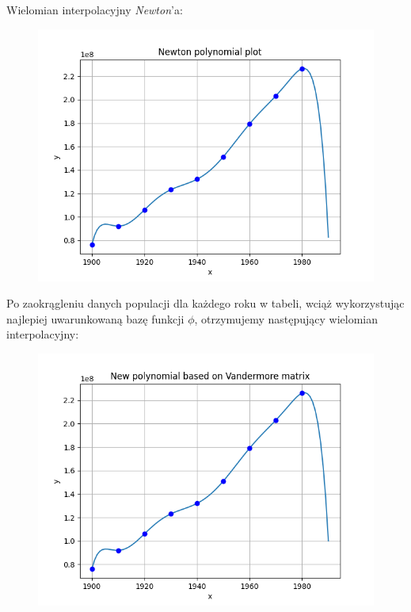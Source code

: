 \documentclass{article}
\begin{document}
Wielomian interpolacyjny \textit{Newton}'a:
\begin{figure}[H]
  \includegraphics[width=\linewidth]{figures/newton.png}
\end{figure}
Po zaokrągleniu danych populacji dla każdego roku w tabeli, wciąż wykorzystując 
najlepiej uwarunkowaną bazę funkcji $\phi$, otrzymujemy następujący 
wielomian interpolacyjny:
\begin{figure}[H]
  \includegraphics[width=\linewidth]{figures/new_vandermore.png}
\end{figure}
\end{document}
